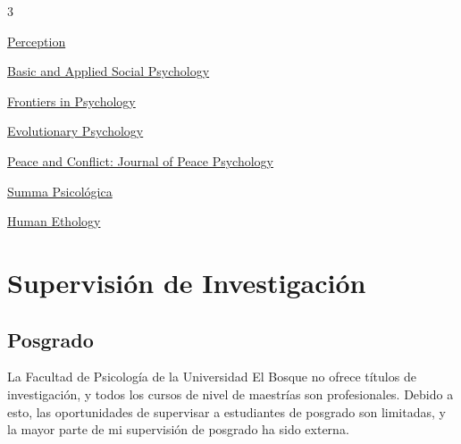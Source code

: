 \documentclass[11pt,a4paper,]{awesome-cv}
\begin{document}
\begin{cventries}
{\begin{cvitems}
\begin{multicols}{3}
\item \href{https://journals.sagepub.com/home/pec}{Perception}
\item \href{https://www.tandfonline.com/journals/hbas20}{Basic and Applied Social Psychology}
\item \href{https://www.frontiersin.org/journals/psychology}{Frontiers in Psychology}
\item \href{https://journals.sagepub.com/home/evp}{Evolutionary Psychology}
\item \href{https://www.apa.org/pubs/journals/pac}{Peace and Conflict: Journal of \newline Peace Psychology}
\item \href{http://sumapsicologica.konradlorenz.edu.co/}{Summa Psicológica}
\item \href{https://ishe.org/human-ethology/}{Human Ethology}
\end{multicols}
\end{cvitems}}
\end{cventries}

\section{Supervisión de
Investigación}\label{supervisiuxf3n-de-investigaciuxf3n}

\subsection{\texorpdfstring{\textbf{Posgrado}}{}}\label{section-8}

La Facultad de Psicología de la Universidad El Bosque no ofrece títulos
de investigación, y todos los cursos de nivel de maestrías son
profesionales. Debido a esto, las oportunidades de supervisar a
estudiantes de posgrado son limitadas, y la mayor parte de mi
supervisión de posgrado ha sido externa.
\end{document}
